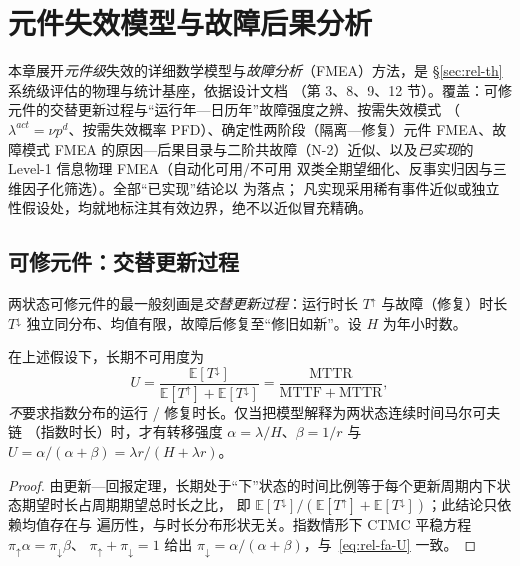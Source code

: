 
\section{元件失效模型与故障后果分析}\label{sec:rel-fa}

\begin{theorynote}
本章展开\emph{元件级}失效的详细数学模型与\emph{故障分析}（FMEA）方法，是 \S\ref{sec:rel-th}
系统级评估的物理与统计基座，依据设计文档
（第 3、8、9、12 节）。覆盖：可修元件的交替更新过程与“运行年—日历年”故障强度之辨、按需失效模式
（$\lambda^{act}=\nu p^d$、按需失效概率 PFD）、确定性两阶段（隔离—修复）元件 FMEA、故障模式 FMEA
的原因—后果目录与二阶共故障（N-2）近似、以及\emph{已实现}的 Level-1 信息物理 FMEA（自动化可用/不可用
双类全期望细化、反事实归因与三维因子化筛选）。全部“已实现”结论以  为落点；
凡实现采用稀有事件近似或独立性假设处，均就地标注其有效边界，绝不以近似冒充精确。
\end{theorynote}

\subsection{可修元件：交替更新过程}\label{sec:rel-fa-renewal}
两状态可修元件的最一般刻画是\emph{交替更新过程}：运行时长 $T^\uparrow$ 与故障（修复）时长
$T^\downarrow$ 独立同分布、均值有限，故障后修复至“修旧如新”。设 $H$ 为年小时数。

\begin{theorem}[更新—回报不可用度]\label{thm:rel-fa-renewal}
在上述假设下，长期不可用度为
\begin{equation}
 U=\frac{\mathbb E[T^\downarrow]}{\mathbb E[T^\uparrow]+\mathbb E[T^\downarrow]}
 =\frac{\mathrm{MTTR}}{\mathrm{MTTF}+\mathrm{MTTR}},
 \label{eq:rel-fa-U}
\end{equation}
\emph{不}要求指数分布的运行 / 修复时长。仅当把模型解释为两状态连续时间马尔可夫链
（指数时长）时，才有转移强度 $\alpha=\lambda/H$、$\beta=1/r$ 与
$U=\alpha/(\alpha+\beta)=\lambda r/(H+\lambda r)$。
\end{theorem}

\begin{proof}
由更新—回报定理，长期处于“下”状态的时间比例等于每个更新周期内下状态期望时长占周期期望总时长之比，
即 $\mathbb E[T^\downarrow]/(\mathbb E[T^\uparrow]+\mathbb E[T^\downarrow])$；此结论只依赖均值存在与
遍历性，与时长分布形状无关。指数情形下 CTMC 平稳方程 $\pi_\uparrow\alpha=\pi_\downarrow\beta$、
$\pi_\uparrow+\pi_\downarrow=1$ 给出 $\pi_\downarrow=\alpha/(\alpha+\beta)$，与~\eqref{eq:rel-fa-U} 一致。
\end{proof}

